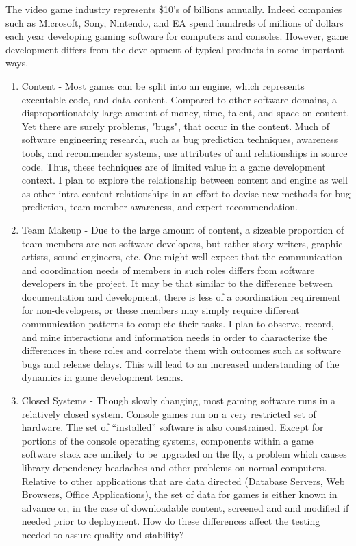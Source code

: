 \documentclass[10pt]{article}
\begin{document}
\begin{small}
The video game industry represents \$10's of billions annually. Indeed
companies such as Microsoft, Sony, Nintendo, and EA spend hundreds of
millions of dollars each year developing gaming software for computers and
consoles.  However, game development differs from the development of typical
products in some important ways.

\begin{enumerate}

\item Content - Most games can be split into an engine, which represents executable code,
    and data content.  Compared to other software domains, a disproportionately large
    amount of money, time, talent, and space on content.  Yet there are surely problems,
    "bugs", that occur in the content.  Much of software engineering research, such as
    bug prediction techniques, awareness tools, and recommender systems, use attributes
    of and relationships in source code.  Thus, these techniques are of limited value
    in a game development context.  I plan to explore the relationship between content
    and engine as well as other intra-content relationships in an effort to devise new
    methods for bug prediction, team member awareness, and expert recommendation.

\item Team Makeup - Due to the large amount of content, a sizeable proportion of team members
    are not software developers, but rather story-writers, graphic artists, sound engineers,
    etc.  One might well expect that the communication and coordination needs of members
    in such roles differs from software developers in the project.  It may be that similar
    to the difference between documentation and development, there is less of a coordination
    requirement for non-developers, or these members may simply require different communication
    patterns to complete their tasks.  I plan to observe, record, and mine
    interactions and information needs in order to characterize the differences in these roles
    and correlate them with outcomes such as software bugs and release delays.  This will lead
    to an increased understanding of the dynamics in game development teams.

\item Closed Systems - Though slowly changing, most gaming software runs in a relatively closed
    system.  Console games run on a very restricted set of hardware.  The set of ``installed''
    software is also constrained.  Except for portions of the console operating systems, 
    components within a game software stack are unlikely to be upgraded on the fly, a problem which
    causes library dependency headaches and other problems on normal computers.  
    Relative to other applications that are data directed (Database Servers, Web Browsers, 
    Office Applications), the set of data for games is either known in advance or,
    in the case of downloadable content, screened and and modified if needed prior to deployment.
    How do these differences affect the testing needed to assure quality and stability?  


\end{enumerate}
\end{small}
\end{document}
